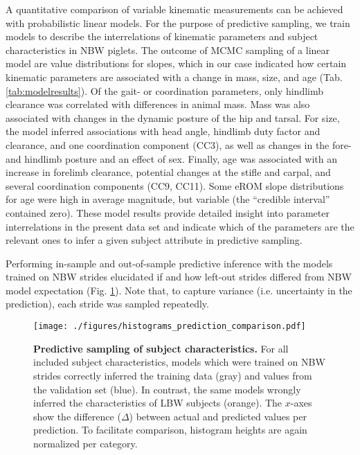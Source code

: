 A quantitative comparison of variable kinematic measurements can be achieved with probabilistic linear models.
For the purpose of predictive sampling, we train models to describe the interrelations of kinematic parameters and subject characteristics in NBW piglets.
The outcome of MCMC sampling of a linear model are value distributions for slopes, which in our case indicated how certain kinematic parameters are associated with a change in mass, size, and age (Tab. \ref{tab:modelresults}).
Of the gait- or coordination parameters, only hindlimb clearance was correlated with differences in animal mass.
Mass was also associated with changes in the dynamic posture of the hip and tarsal.
For size, the model inferred associations with head angle, hindlimb duty factor and clearance, and one coordination component (CC3), as well as changes in the fore- and hindlimb posture and an effect of sex.
Finally, age was associated with an increase in forelimb clearance, potential changes at the stifle and carpal, and several coordination components (CC9, CC11).
Some eROM slope distributions for age were high in average magnitude, but variable (the ``credible interval'' contained zero).
These model results provide detailed insight into parameter interrelations in the present data set and indicate which of the parameters are the relevant ones to infer a given subject attribute in predictive sampling.



\bigskip

Performing in-sample and out-of-sample predictive inference with the models trained on NBW strides elucidated if and how left-out strides differed from NBW model expectation (Fig. \ref{fig:predictions}).
Note that, to capture variance (i.e. uncertainty in the prediction), each stride was sampled repeatedly.

\begin{figure}[p]
\centering
\texttt{[image: ./figures/histograms\_prediction\_comparison.pdf]}
\caption{\label{fig:predictions}\textbf{Predictive sampling of subject characteristics.} For all included subject characteristics, models which were trained on NBW strides correctly inferred the training data (gray) and values from the validation set (blue). In contrast, the same models wrongly inferred the characteristics of LBW subjects (orange). The \(x\)-axes show the difference (\(\Delta\)) between actual and predicted values per prediction. To facilitate comparison, histogram heights are again normalized per category.}
\end{figure}


